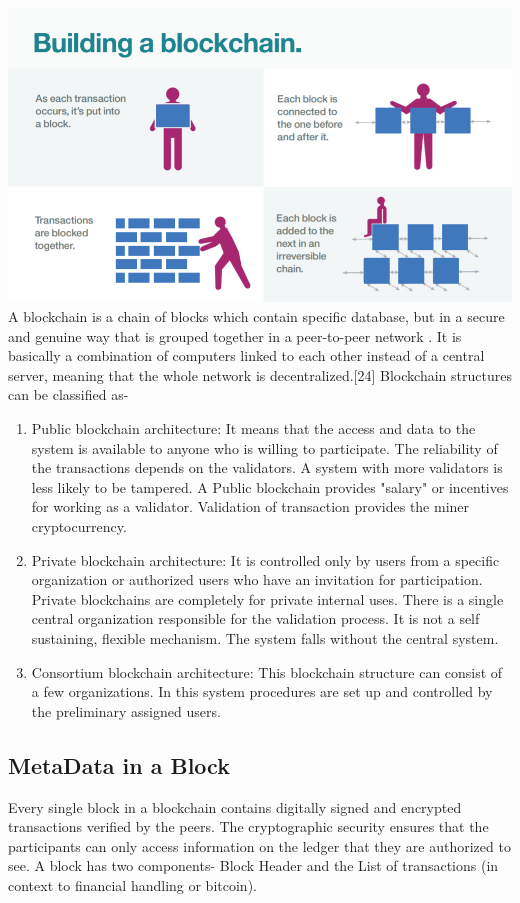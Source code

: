 \documentclass{article}
\begin{document}
\includegraphics[scale=0.50]{voorbeeld3.png}
\\
A blockchain is a chain of blocks which contain specific database, but in a secure and genuine way that is grouped together in a peer-to-peer network . It is basically a combination of computers linked to each other instead of a central server, meaning that the whole network is decentralized.[24]
Blockchain structures can be classified as-
\begin{enumerate}
\item Public blockchain architecture: It means that the access and data to the system is available to anyone who is willing to participate. The reliability of the transactions depends on the validators. A system with more validators is less likely to be tampered. A Public blockchain provides "salary" or incentives for working as a validator. Validation of transaction provides the miner cryptocurrency.
\item Private blockchain architecture: It is controlled only by users from a specific organization or authorized users who have an invitation for participation. Private blockchains are completely for private internal uses. There is a single central organization responsible for the validation process. It is not a self sustaining, flexible mechanism. The system falls without the central system.
\item Consortium blockchain architecture: This blockchain structure can consist of a few organizations. In this system procedures are set up and controlled by the preliminary assigned users.
\end{enumerate}
\subsection{MetaData in a Block}
Every single block in a blockchain contains digitally signed and encrypted transactions verified by the peers. The cryptographic security ensures that the participants can only access information on the ledger that they are authorized to see. A block has two components- Block Header and the List of transactions (in context to financial handling or bitcoin).
\end{document}
